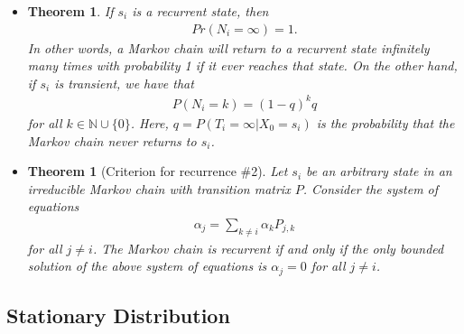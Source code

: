 \documentclass[10pt]{article}
\newtheorem{theorem}[lemma]{Theorem}
\begin{document}
\begin{itemize}
  \item \begin{theorem}
    If $s_i$ is a recurrent state, then
    \begin{align*}
        Pr(N_i = \infty) = 1.
    \end{align*}
    In other words, a Markov chain will return to a recurrent state infinitely many times with probability 1 if it ever reaches that state. On the other hand, if $s_i$ is transient, we have that
    \begin{align*}
        P(N_i = k) = (1-q)^k q
    \end{align*}
    for all $k \in \mathbb{N} \cup \{0\}$. Here, $q = P(T_i = \infty | X_0 = s_i)$ is the probability that the Markov chain never returns to $s_i$.
  \end{theorem}

  \item \begin{theorem}[Criterion for recurrence \#2] Let $s_i$ be an arbitrary state in an irreducible Markov chain with transition matrix $P$. Consider the system of equations
    \begin{align*}
        \alpha_j = \sum_{k \neq i} \alpha_k P_{j,k}
    \end{align*}
    for all $j \neq i$. The Markov chain is recurrent if and only if the only bounded solution of the above system of equations is $\alpha_j = 0$ for all $j \neq i$.
  \end{theorem}  
\end{itemize}

\subsection{Stationary Distribution}
\end{document}
